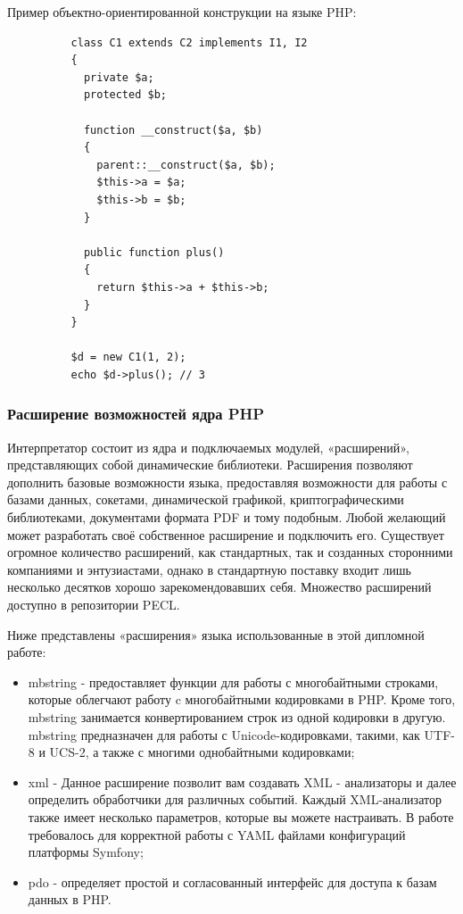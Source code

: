 Пример объектно-ориентированной конструкции на языке PHP: 
\begin{lstlisting}
          class C1 extends C2 implements I1, I2
          {
            private $a;
            protected $b;

            function __construct($a, $b)
            {
              parent::__construct($a, $b);
              $this->a = $a;
              $this->b = $b;
            }

            public function plus()
            {
              return $this->a + $this->b;
            }
          }

          $d = new C1(1, 2);
          echo $d->plus(); // 3
\end{lstlisting}

\subsubsection{Расширение возможностей ядра PHP }
\label{sub:practice:extebtions_php}
Интерпретатор состоит из ядра и подключаемых модулей, «расширений», представляющих собой динамические библиотеки. Расширения позволяют дополнить базовые возможности языка, предоставляя возможности для работы с базами данных, сокетами, динамической графикой, криптографическими библиотеками, документами формата PDF и тому подобным. Любой желающий может разработать своё собственное расширение и подключить его. Существует огромное количество расширений, как стандартных, так и созданных сторонними компаниями и энтузиастами, однако в стандартную поставку входит лишь несколько десятков хорошо зарекомендовавших себя. Множество расширений доступно в репозитории PECL.

Ниже представлены «расширения» языка использованные в этой дипломной работе:
\begin{itemize}
  \item mbstring - предоставляет функции для работы с многобайтными строками, которые облегчают работу c многобайтными кодировками в PHP. Кроме того, mbstring занимается конвертированием строк из одной кодировки в другую. mbstring предназначен для работы с Unicode-кодировками, такими, как UTF-8 и UCS-2, а также с многими однобайтными кодировками;
  \item xml - Данное расширение позволит вам создавать XML - анализаторы и далее определить обработчики для различных событий. Каждый XML-анализатор также имеет несколько параметров, которые вы можете настраивать. В работе требовалось для корректной работы с YAML файлами конфигураций платформы Symfony;
  \item pdo - определяет простой и согласованный интерфейс для доступа к базам данных в PHP.
\end{itemize}

